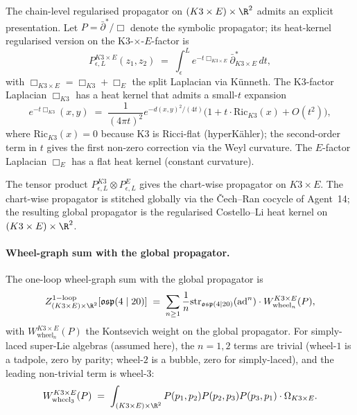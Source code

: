The chain-level regularised propagator on $(K3 \times E) \times \R^2$
admits an explicit presentation. Let $P = \bar\partial^* / \Box$ denote
the symbolic propagator; its heat-kernel regularised version on the
K3-$\times$-$E$-factor is
\begin{equation}
\label{eq:heat-kernel-k3e}
 P^{K3 \times E}_{\epsilon, L}(z_1, z_2)
 \;=\; \int_\epsilon^L e^{-t \Box_{K3 \times E}} \bar\partial^*_{K3 \times E}\, dt,
\end{equation}
with $\Box_{K3 \times E} = \Box_{K3} + \Box_E$ the split Laplacian
via Künneth. The K3-factor Laplacian $\Box_{K3}$ has a heat kernel
that admits a small-$t$ expansion
\begin{equation}
\label{eq:k3-heat-kernel-small-t}
 e^{-t \Box_{K3}}(x, y) \;=\; \frac{1}{(4\pi t)^{2}} e^{-d(x,y)^2/(4t)}
 \bigl( 1 + t \cdot \mathrm{Ric}_{K3}(x) + O(t^2) \bigr),
\end{equation}
where $\mathrm{Ric}_{K3}(x) = 0$ because K3 is Ricci-flat (hyperKähler);
the second-order term in $t$ gives the first non-zero correction via
the Weyl curvature. The $E$-factor Laplacian $\Box_E$ has a flat
heat kernel (constant curvature).

The tensor product $P^{K3}_{\epsilon, L} \otimes P^E_{\epsilon, L}$
gives the chart-wise propagator on $K3 \times E$. The chart-wise
propagator is stitched globally via the Čech--Ran cocycle of Agent~14;
the resulting global propagator is the regularised Costello--Li heat
kernel on $(K3 \times E) \times \R^2$.

\paragraph{Wheel-graph sum with the global propagator.}
The one-loop wheel-graph sum with the global propagator is
\begin{equation}
\label{eq:global-wheel-graph-sum}
 Z^{\mathrm{1-loop}}_{(K3 \times E) \times \R^2} [\mathfrak{osp}(4 \mid 20)]
 \;=\; \sum_{n \geq 1} \frac{1}{n} \mathrm{str}_{\mathfrak{osp}(4 \mid 20)}
 (\mathrm{ad}^n) \cdot W^{K3 \times E}_{\mathrm{wheel}_n}(P),
\end{equation}
with $W^{K3 \times E}_{\mathrm{wheel}_n}(P)$ the Kontsevich weight on
the global propagator. For simply-laced super-Lie algebras (assumed
here), the $n = 1, 2$ terms are trivial (wheel-$1$ is a tadpole, zero
by parity; wheel-$2$ is a bubble, zero for simply-laced), and the
leading non-trivial term is wheel-$3$:
\begin{equation}
\label{eq:wheel-3-contribution}
 W^{K3 \times E}_{\mathrm{wheel}_3}(P)
 \;=\; \int_{(K3 \times E) \times \R^2}
 P(p_1, p_2) P(p_2, p_3) P(p_3, p_1)
 \cdot \Omega_{K3 \times E}.
\end{equation}

